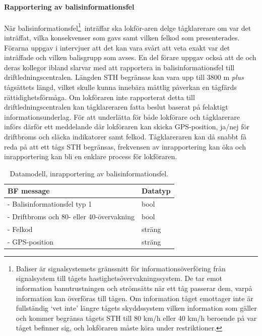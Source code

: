 \paragraph{Rapportering av balisinformationsfel}
När balisinformationsfel\footnote{Baliser är signalsystemets gränssnitt för informationsöverföring från signalsystem till tågets hastighetsövervakningssystem. De tar emot information banutrustningen och strömsätts när ett tåg passerar dem, varpå information kan överföras till tågen. Om information tåget emottager inte är fullständig \lq{}vet inte\rq{} längre tågets skyddssystem vilken information som gäller och kommer begränsa tågets STH till 80 km/h eller 40 km/h beroende på var tåget befinner sig, och lokföraren måste köra under restriktioner\cite{TTJ2015}.}~inträffar ska lokför-aren delge tågklarerare om var det inträffat, vilka konsekvenser som gavs samt vilken felkod som presenterades.
Förarna uppgav i intervjuer att det kan vara svårt att veta exakt var det inträffade och vilken balisgrupp som avses.
En del förare uppgav också att de och deras kollegor ibland slarvar med att rapportera in balisinformationsfel till driftledningscentralen.
Längden STH begränsas kan vara upp till 3800 m \emph{plus} tågsättets längd, vilket skulle kunna innebära måttlig påverkan en tågfärds rättidighetsförmåga.
Om lokföraren inte rapporterat detta till driftledningscentralen kan tågklareraren fatta beslut baserat på felaktigt informationsunderlag.
För att underlätta för både lokförare och tågklarerare införs därför ett meddelande där lokföraren kan skicka GPS-position, ja/nej för driftbroms och släcka indikatorer samt felkod.
Tågklareraren kan då snabbt få reda på att ett tågs STH begränsas, frekvensen av inrapportering kan öka och inrapportering kan bli en enklare process för lokföraren.
\begin{table}[hbt!]
    \centering
    \begin{tabular}{|l|l|}
        \hline
        \color{blue}
        \textbf{BF message} & Datatyp \\
        \hline
        - Balisinformationsfel typ 1 & bool  \\
        - Driftbroms och 80- eller 40-övervakning & bool \\
        - Felkod & sträng \\
        - GPS-position & sträng \\
        \hline
    \end{tabular}
    \caption{Datamodell, inrapportering av balisinformationsfel.}
    \label{tab:bf}
\end{table}
